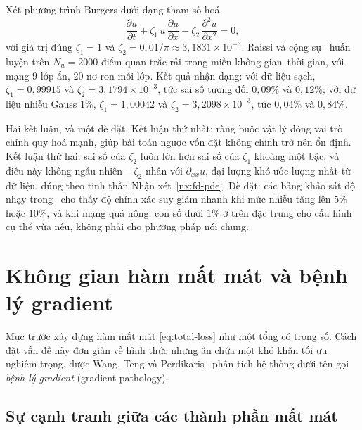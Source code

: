 \begin{vidu}
\label{vd:burgers-inverse}
Xét phương trình Burgers dưới dạng tham số hoá
\begin{equation}
\frac{\partial u}{\partial t}
+ \zeta_{1}\, u\, \frac{\partial u}{\partial x}
- \zeta_{2}\, \frac{\partial^{2} u}{\partial x^{2}} = 0,
\label{eq:burgers-param}
\end{equation}
với giá trị đúng $\zeta_{1} = 1$ và
$\zeta_{2} = 0{,}01/\pi \approx 3{,}1831\times 10^{-3}$. Raissi và cộng
sự~\cite{raissi2019} huấn luyện trên $N_u = 2000$ điểm quan trắc rải trong miền
không gian--thời gian, với mạng $9$ lớp ẩn, $20$ nơ-ron mỗi lớp. Kết quả nhận
dạng: với dữ liệu sạch, $\zeta_1 = 0{,}99915$ và
$\zeta_2 = 3{,}1794\times10^{-3}$, tức sai số tương đối $0{,}09\%$ và
$0{,}12\%$; với dữ liệu nhiễu Gauss $1\%$, $\zeta_1 = 1{,}00042$ và
$\zeta_2 = 3{,}2098\times10^{-3}$, tức $0{,}04\%$ và $0{,}84\%$.
 
Hai kết luận, và một dè dặt. Kết luận thứ nhất: ràng buộc vật lý đóng vai trò
chính quy hoá mạnh, giúp bài toán ngược vốn đặt không chỉnh trở nên ổn định.
Kết luận thứ hai: sai số của $\zeta_2$ luôn lớn hơn sai số của $\zeta_1$ khoảng
một bậc, và điều này không ngẫu nhiên -- $\zeta_2$ nhân với $\partial_{xx}u$, đại
lượng khó ước lượng nhất từ dữ liệu, đúng theo tinh thần
Nhận xét~\ref{nx:fd-pde}. Dè dặt: các bảng khảo sát độ nhạy
trong~\cite{raissi2019} cho thấy độ chính xác suy giảm nhanh khi mức nhiễu tăng
lên $5\%$ hoặc $10\%$, và khi mạng quá nông; con số dưới $1\%$ ở trên đặc trưng
cho cấu hình cụ thể vừa nêu, không phải cho phương pháp nói chung.
\end{vidu}
 
\section{Không gian hàm mất mát và bệnh lý gradient}
\label{sec:gradient-pathology}
 
Mục trước xây dựng hàm mất mát \eqref{eq:total-loss} như một tổng có trọng số.
Cách đặt vấn đề này đơn giản về hình thức nhưng ẩn chứa một khó khăn tối ưu
nghiêm trọng, được Wang, Teng và Perdikaris~\cite{wang2021} phân tích hệ thống
dưới tên gọi \emph{bệnh lý gradient} (gradient pathology).
 
\subsection{Sự cạnh tranh giữa các thành phần mất mát}
\label{subsec:canh-tranh}
 
